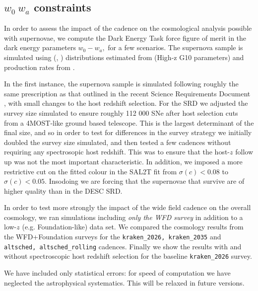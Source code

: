 \subsection{$w_0~w_a$ constraints}


In order to assess the impact of the cadence on the cosmological analysis possible with supernovae, we compute the Dark Energy Task force figure of merit \cite{2006astro.ph..9591A} in the dark energy parameters $w_0-w_a,$ for a few scenarios. The supernova sample is simulated using (\strech, \sncolor) distributions estimated from \cite{2016ApJ...822L..35S} (High-z G10 parameters) and production rates from  \cite{2008ApJ...682..262D}.

In the first instance, the supernova sample is simulated following roughly the same prescription as that outlined in the recent Science Requirements Document \cite{2018arXiv180901669T}, with small changes to the host redshift selection. For the SRD we adjusted the survey size simulated to ensure roughly 112 000 SNe after host selection cuts from a 4MOST-like ground based telescope. This is the largest determinant of the final size, and so in order to test for differences in the survey strategy we initially doubled the survey size simulated, and then tested a few cadences without requiring any spectrosopic host redshift. This was to ensure that the host-$z$ follow up was not the most important characteristic.
In addition, we imposed a more restrictive cut on the fitted colour in the SAL2T fit from $\sigma(c) < 0.08$ to $\sigma(c) < 0.05.$ Insodoing we are forcing that the supernovae that survive are of higher quality than in the DESC SRD.

In order to test more strongly the impact of the wide field cadence on the overall cosmology, we ran simulations including \textit{only the WFD survey} in addition to a low-$z$ (e.g. Foundation-like) data set. We compared the cosmology results from the WFD+Foundation surveys for the {\tt kraken\_2026, kraken\_2035} and {\tt altsched, altsched\_rolling} cadences. Finally we show the results with and without spectroscopic host redshift selection for the baseline {\tt kraken\_2026} survey.

We have included only statistical errors: for speed of computation we have neglected the astrophysical systematics. This will be relaxed in future versions.


